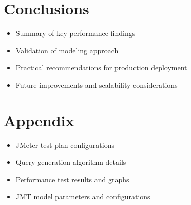 \documentclass[12pt]{article}
\begin{document}
\section{Conclusions}
\begin{itemize}
    \item Summary of key performance findings
    \item Validation of modeling approach
    \item Practical recommendations for production deployment
    \item Future improvements and scalability considerations
\end{itemize}

\appendix
\section{Appendix}
\begin{itemize}
    \item JMeter test plan configurations
    \item Query generation algorithm details
    \item Performance test results and graphs
    \item JMT model parameters and configurations
\end{itemize}
\end{document}
